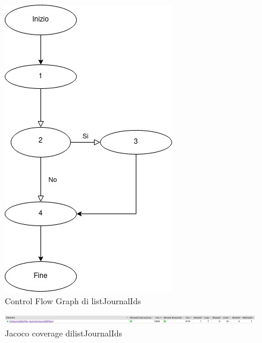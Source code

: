 \documentclass[12pt, a4paper]{article}
\begin{document}
  \begin{figure}
    \includegraphics[width=\linewidth]{CFGlistJournalIds.jpg}
    \caption{Control Flow Graph di listJournalIds}
    \label{fig:listJournalIdsCFG}
  \end{figure}

  \begin{figure}
    \includegraphics[width=\linewidth]{JacocoCoveragelistJournalIds1.png}
    \caption{Jacoco coverage dilistJournalIds}
    \label{fig:listJournalIdsCFG}
  \end{figure}
\end{document}
